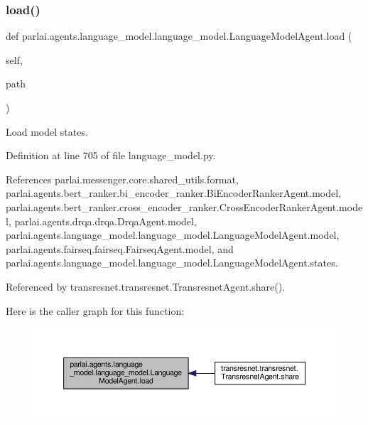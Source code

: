 \subsubsection{\texorpdfstring{load()}{load()}}
{\footnotesize\ttfamily def parlai.\+agents.\+language\+\_\+model.\+language\+\_\+model.\+Language\+Model\+Agent.\+load (\begin{DoxyParamCaption}\item[{}]{self,  }\item[{}]{path }\end{DoxyParamCaption})}

\begin{DoxyVerb}Load model states.\end{DoxyVerb}
 

Definition at line 705 of file language\+\_\+model.\+py.



References parlai.\+messenger.\+core.\+shared\+\_\+utils.\+format, parlai.\+agents.\+bert\+\_\+ranker.\+bi\+\_\+encoder\+\_\+ranker.\+Bi\+Encoder\+Ranker\+Agent.\+model, parlai.\+agents.\+bert\+\_\+ranker.\+cross\+\_\+encoder\+\_\+ranker.\+Cross\+Encoder\+Ranker\+Agent.\+model, parlai.\+agents.\+drqa.\+drqa.\+Drqa\+Agent.\+model, parlai.\+agents.\+language\+\_\+model.\+language\+\_\+model.\+Language\+Model\+Agent.\+model, parlai.\+agents.\+fairseq.\+fairseq.\+Fairseq\+Agent.\+model, and parlai.\+agents.\+language\+\_\+model.\+language\+\_\+model.\+Language\+Model\+Agent.\+states.



Referenced by transresnet.\+transresnet.\+Transresnet\+Agent.\+share().

Here is the caller graph for this function\+:
\nopagebreak
\begin{figure}[H]
\begin{center}
\leavevmode
\includegraphics[width=350pt]{classparlai_1_1agents_1_1language__model_1_1language__model_1_1LanguageModelAgent_a3b1a39e1467680e19dccfcfb8dae4273_icgraph}
\end{center}
\end{figure}
\mbox{\label{classparlai_1_1agents_1_1language__model_1_1language__model_1_1LanguageModelAgent_a8f879ddce0947b8b56f980f7f4fea07b}} 
